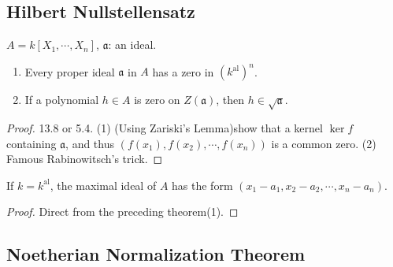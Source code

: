 \subsection{Hilbert Nullstellensatz}

\( A = k[X_1, \cdots, X_n] \), \( \mathfrak{a} \): an ideal.

\begin{theorem}[Nullstellensatz]
  \begin{enumerate}
  \item Every proper ideal \( \mathfrak{a} \) in \( A \) has a zero in \( (k^{\operatorname{al}})^n \).
  \item If a polynomial \( h \in A \) is zero on \( Z(\mathfrak{a}) \), then \( h \in \sqrt{\mathfrak{a}} \).
  \end{enumerate}
\end{theorem}
\begin{proof}
  \cite{milneCA} 13.8 or \cite{Matsumura1989-ab} 5.4.
  (1) (Using Zariski's Lemma)show that a kernel \( \operatorname{ker} f \) containing \( \mathfrak{a} \), and thus \( (f(x_1), f(x_2), \cdots, f(x_n)) \) is a common zero.
  (2) Famous Rabinowitsch's trick.
\end{proof}

\begin{theorem}
  If \( k = k^{\operatorname{al}} \), the maximal ideal of \( A \) has the form $(x_1 - a_1, x_2 - a_2, \cdots, x_n - a_n)$.
\end{theorem}
\begin{proof}
  Direct from the preceding theorem(1).
\end{proof}

\subsection{Noetherian Normalization Theorem}

